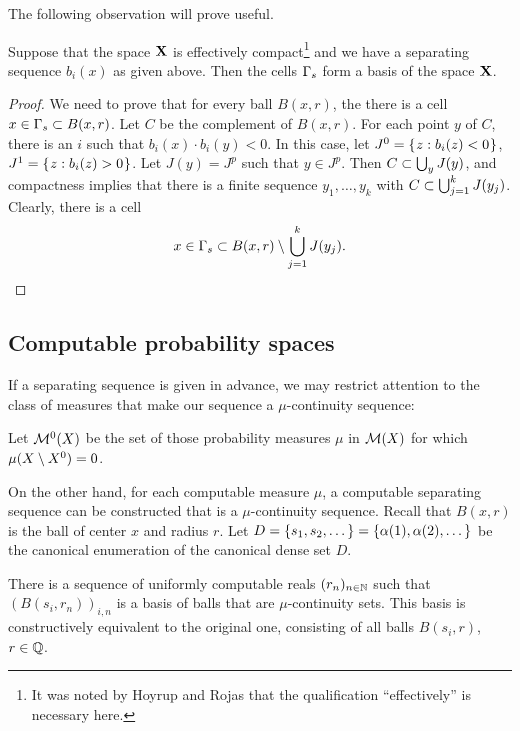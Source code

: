 The following observation will prove useful.

 \begin{proposition}\label{propo:compact-cell-basis}
  \notready
Suppose that the space \( \mathbf{X} \) is effectively compact\footnote{It was noted by
  Hoyrup and Rojas that the qualification ``effectively'' is necessary here.}
 and we have a separating sequence \( b_{i}(x) \) as given above.
Then the cells \( \Gamma_{s} \) form a basis of the space \( \mathbf{X} \).
 \end{proposition}
 \begin{proof}
  \notready
We need to prove that for every ball \( B(x,r) \), the there is a cell
\( x\in\Gamma_{s}\subset B(x,r) \).
Let \( C \) be the complement of \( B(x,r) \).
For each point \( y \) of \( C \), there is an \( i \) such that
\( b_{i}(x)\cdot b_{i}(y) < 0 \).
In this case, let \( J^{0} = \mathopen\{\mskip 1mu z: b_{i}(z) < 0\mskip 1mu\mathclose\} \),
\( J^{1} = \mathopen\{\mskip 1mu z: b_{i}(z) > 0\mskip 1mu\mathclose\} \).
Let \( J(y)=J^{p} \) such that \( y\in J^{p} \).
Then \( C \subset \bigcup_{y} J(y) \), and compactness implies that there is a
finite sequence \( y_{1},\dots,y_{k} \) with 
\( C \subset \bigcup_{j=1}^{k} J(y_{j}) \).
Clearly, there is a cell 
 \[
  x \in \Gamma_{s} \subset B(x,r) \setminus \bigcup_{j=1}^{k} J(y_{j}).
 \]
 \end{proof}


\subsection{Computable probability spaces}

If a separating sequence is given in advance, we may
restrict attention to the class of measures that make our sequence a
\( \mu \)-continuity sequence:

 \begin{definition}
  \label{def:g4.7.8}
  \notready
Let \( \mathcal{M}^{0}(X) \) be the set of those probability measures \( \mu \)
in \( \mathcal{M}(X) \) for which \( \mu(X \setminus X^{0})=0 \).
 \end{definition}

On the other hand, for each computable measure \( \mu \),
a computable separating sequence can be constructed that is a \( \mu \)-continuity
sequence.
Recall that \( B(x,r) \) is the ball of center \( x \) and radius \( r \).
Let \( D=\{s_{1},s_{2},\dots\}=\{\alpha(1),\alpha(2),\dots\} \) 
be the canonical enumeration of the canonical dense set \( D \).

\begin{theorem}\label{thm:continuity-balls}
  \notready
There is a sequence of uniformly computable reals \( (r_n)_{n\in \mathbb{N}} \) such
that \( (B(s_{i},r_{n}))_{i,n} \) is a basis of balls that are \( \mu \)-continuity sets.
This basis is constructively equivalent to the original one, consisting of all 
balls \( B(s_{i},r) \), \( r\in\mathbb{Q} \).
\end{theorem}


